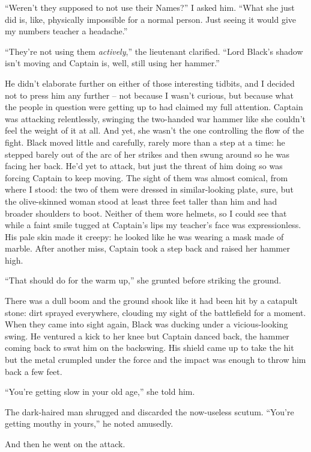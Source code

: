 \documentclass[12pt, openany]{book}
\begin{document}
“Weren’t they supposed to not use their Names?” I asked him. “What she just did is, like, physically impossible for a normal person. Just seeing it would give my numbers teacher a headache.”

“They’re not using them \textit{actively},” the lieutenant clarified. “Lord Black’s shadow isn’t moving and Captain is, well, still using her hammer.”

He didn’t elaborate further on either of those interesting tidbits, and I decided not to press him any further – not because I wasn’t curious, but because what the people in question were getting up to had claimed my full attention. Captain was attacking relentlessly, swinging the two-handed war hammer like she couldn’t feel the weight of it at all. And yet, she wasn’t the one controlling the flow of the fight. Black moved little and carefully, rarely more than a step at a time: he stepped barely out of the arc of her strikes and then swung around so he was facing her back. He’d yet to attack, but just the threat of him doing so was forcing Captain to keep moving. The sight of them was almost comical, from where I stood: the two of them were dressed in similar-looking plate, sure, but the olive-skinned woman stood at least three feet taller than him and had broader shoulders to boot. Neither of them wore helmets, so I could see that while a faint smile tugged at Captain’s lips my teacher’s face was expressionless. His pale skin made it creepy: he looked like he was wearing a mask made of marble. After another miss, Captain took a step back and raised her hammer high.

“That should do for the warm up,” she grunted before striking the ground.

There was a dull boom and the ground shook like it had been hit by a catapult stone: dirt sprayed everywhere, clouding my sight of the battlefield for a moment. When they came into sight again, Black was ducking under a vicious-looking swing. He ventured a kick to her knee but Captain danced back, the hammer coming back to swat him on the backswing. His shield came up to take the hit but the metal crumpled under the force and the impact was enough to throw him back a few feet.

“You’re getting slow in your old age,” she told him.

The dark-haired man shrugged and discarded the now-useless scutum. “You’re getting mouthy in yours,” he noted amusedly.

And then he went on the attack.
\end{document}
